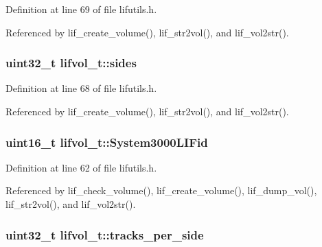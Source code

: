 Definition at line 69 of file lifutils.\+h.



Referenced by lif\+\_\+create\+\_\+volume(), lif\+\_\+str2vol(), and lif\+\_\+vol2str().

\subsubsection[{\texorpdfstring{sides}{sides}}]{\setlength{\rightskip}{0pt plus 5cm}uint32\+\_\+t lifvol\+\_\+t\+::sides}\hypertarget{structlifvol__t_a5b8ecfb441b010f69cb90b923cc50719}{}\label{structlifvol__t_a5b8ecfb441b010f69cb90b923cc50719}


Definition at line 68 of file lifutils.\+h.



Referenced by lif\+\_\+create\+\_\+volume(), lif\+\_\+str2vol(), and lif\+\_\+vol2str().

\subsubsection[{\texorpdfstring{System3000\+L\+I\+Fid}{System3000LIFid}}]{\setlength{\rightskip}{0pt plus 5cm}uint16\+\_\+t lifvol\+\_\+t\+::\+System3000\+L\+I\+Fid}\hypertarget{structlifvol__t_a98097f8c951448cbab6019b7b703e4d0}{}\label{structlifvol__t_a98097f8c951448cbab6019b7b703e4d0}


Definition at line 62 of file lifutils.\+h.



Referenced by lif\+\_\+check\+\_\+volume(), lif\+\_\+create\+\_\+volume(), lif\+\_\+dump\+\_\+vol(), lif\+\_\+str2vol(), and lif\+\_\+vol2str().

\subsubsection[{\texorpdfstring{tracks\+\_\+per\+\_\+side}{tracks_per_side}}]{\setlength{\rightskip}{0pt plus 5cm}uint32\+\_\+t lifvol\+\_\+t\+::tracks\+\_\+per\+\_\+side}\hypertarget{structlifvol__t_aae9e5135f98b80312eb785ac3747fc31}{}\label{structlifvol__t_aae9e5135f98b80312eb785ac3747fc31}


